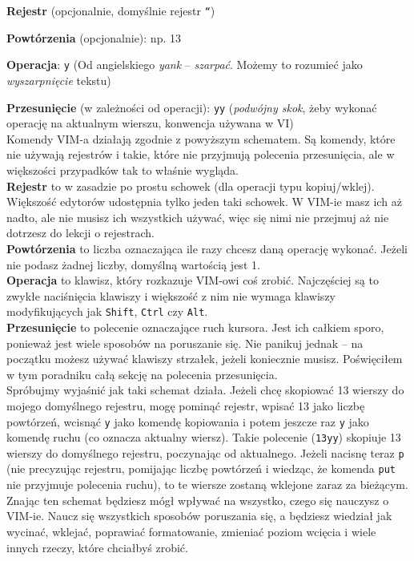 \documentclass[a4paper,12pt]{article}
\begin{document}
      {\bf Rejestr} (opcjonalnie, domyślnie rejestr {\tt “})
      
      {\bf Powtórzenia} (opcjonalnie): np. 13
      
      {\bf Operacja}: {\tt y} (Od angielskiego {\it yank} – {\it szarpać}. Możemy to rozumieć jako {\it wyszarpnięcie} tekstu)
      
      {\bf Przesunięcie} (w zależności od operacji): {\tt yy} ({\it podwójny skok}, żeby wykonać operację na aktualnym wierszu, konwencja używana w VI) \\

\noindent      
Komendy VIM-a działają zgodnie z powyższym schematem. Są komendy, które nie używają rejestrów i takie, które nie przyjmują polecenia przesunięcia, ale w większości przypadków tak to właśnie wygląda.\\
{\bf Rejestr} to w zasadzie po prostu schowek (dla operacji typu kopiuj/wklej). Większość edytorów udostępnia tylko jeden taki schowek. W VIM-ie masz ich aż nadto, ale nie musisz ich wszystkich używać, więc się nimi nie przejmuj aż nie dotrzesz do lekcji o rejestrach.\\
{\bf Powtórzenia} to liczba oznaczająca ile razy chcesz daną operację wykonać. Jeżeli nie podasz żadnej liczby, domyślną wartością jest 1.\\
{\bf Operacja} to klawisz, który rozkazuje VIM-owi coś zrobić. Najczęściej są to zwykłe naciśnięcia klawiszy i większość z nim nie wymaga klawiszy modyfikujących jak {\tt Shift}, {\tt Ctrl} czy {\tt Alt}.\\
{\bf Przesunięcie} to polecenie oznaczające ruch kursora. Jest ich całkiem sporo, ponieważ jest wiele sposobów na poruszanie się. Nie panikuj jednak – na początku możesz używać klawiszy strzałek, jeżeli koniecznie musisz. Poświęciłem w tym poradniku całą sekcję na polecenia przesunięcia.\\
Spróbujmy wyjaśnić jak taki schemat działa. Jeżeli chcę skopiować 13 wierszy do mojego domyślnego rejestru, mogę pominąć rejestr, wpisać 13 jako liczbę powtórzeń, wcisnąć {\tt y} jako komendę kopiowania i potem jeszcze raz {\tt y} jako komendę ruchu (co oznacza aktualny wiersz). Takie polecenie ({\tt 13yy}) skopiuje 13 wierszy do domyślnego rejestru, poczynając od aktualnego. Jeżeli nacisnę teraz {\tt p} (nie precyzując rejestru, pomijając liczbę powtórzeń i wiedząc, że komenda {\tt put} nie przyjmuje polecenia ruchu), to te wiersze zostaną wklejone zaraz za bieżącym.\\
Znając ten schemat będziesz mógł wpływać na wszystko, czego się nauczysz o VIM-ie. Naucz się wszystkich sposobów poruszania się, a będziesz wiedział jak wycinać, wklejać, poprawiać formatowanie, zmieniać poziom wcięcia i wiele innych rzeczy, które chciałbyś zrobić.
\end{document}
